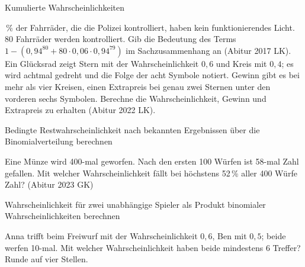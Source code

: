 \begin{aufgabe}{Kumulierte Wahrscheinlichkeiten}
\begin{teile}
\,\% der Fahrräder, die die Polizei kontrolliert, haben kein funktionierendes Licht. 80 Fahrräder werden kontrolliert. Gib die Bedeutung des Terms $1 - (0{,}94^{80} + 80 \cdot 0{,}06 \cdot 0{,}94^{79})$ im Sachzusammenhang an \hfill (Abitur 2017 LK).
\teil Ein Glücksrad zeigt Stern mit der Wahrscheinlichkeit $0{,}6$ und Kreis mit $0{,}4$; es wird achtmal gedreht und die Folge der acht Symbole notiert. Gewinn gibt es bei mehr als vier Kreisen, einen Extrapreis bei genau zwei Sternen unter den vorderen sechs Symbolen. Berechne die Wahrscheinlichkeit, Gewinn und Extrapreis zu erhalten \hfill (Abitur 2022 LK). \leerfeld
\end{teile}
\end{aufgabe}

\begin{aufgabe}{Bedingte Restwahrscheinlichkeit nach bekannten Ergebnissen über die Binomialverteilung berechnen}
\begin{teile}
\teil Eine Münze wird 400-mal geworfen. Nach den ersten 100 Würfen ist 58-mal Zahl gefallen. Mit welcher Wahrscheinlichkeit fällt bei höchstens 52\,\% aller 400 Würfe Zahl? \hfill (Abitur 2023 GK) \\ \leerfeld
\end{teile}
\end{aufgabe}

\begin{aufgabe}{Wahrscheinlichkeit für zwei unabhängige Spieler als Produkt binomialer Wahrscheinlichkeiten berechnen}
\begin{teile}
\teil Anna trifft beim Freiwurf mit der Wahrscheinlichkeit $0{,}6$, Ben mit $0{,}5$; beide werfen 10-mal. Mit welcher Wahrscheinlichkeit haben beide mindestens 6 Treffer? Runde auf vier Stellen. \leerfeld
\end{teile}
\end{aufgabe}

